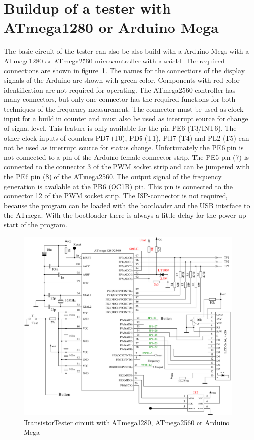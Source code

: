 \section{Buildup of a tester with ATmega1280 or Arduino Mega}
The basic circuit of the tester can also be also build with a Arduino Mega with a ATmega1280
or ATmega2560 microcontroller with a shield.
The required connections are shown in figure~\ref{fig:t1280tester}.
The names for the connections of the display signals of the Arduino are shown with green color.
Components with red color identification are not required for operating.
The ATmega2560 controller has many connectors, but only one connector has the required
functions for both techniques of the frequency measurement.
The connector must be used as clock input for a build in counter and must also be 
used as interrupt source for change of signal level.
This feature is only available for the pin PE6 (T3/INT6).
The other clock inputs of counters PD7 (T0), PD6 (T1), PH7 (T4) and PL2 (T5) can not be 
used as interrupt source for status change.
Unfortunately the PE6 pin is not connected to a pin of the Arduino female connector strip.
The PE5 pin (7) is connected to the connector 3 of the PWM socket strip and
can be jumpered with the PE6 pin (8) of the ATmega2560.
The output signal of the frequency generation is available at the PB6 (OC1B) pin.
This pin is connected to the connector 12 of the PWM socket strip.
The ISP-connector is not required, because the program can be loaded with the bootloader
and the USB interface to the ATmega. With the bootloader there is always a
little delay for the power up start of the program.

\begin{figure}[H]
\centering
\includegraphics[width=1.\textwidth]{../FIG/t1280tester.pdf}
\caption{TransistorTester circuit with ATmega1280, ATmega2560 or Arduino Mega}
\label{fig:t1280tester}
\end{figure}

